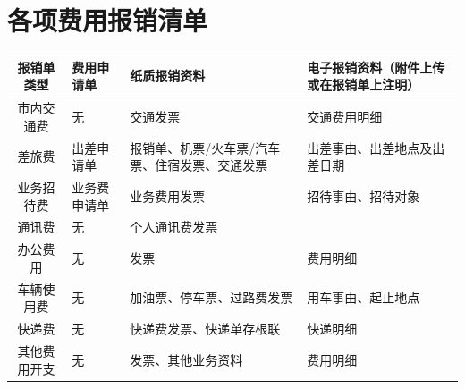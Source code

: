 \documentclass[scheme=plain,UTF8]{ctexart}
\begin{document}
\section{各项费用报销清单}

\begin{longtable}{|c|p{30mm}|p{40mm}|p{50mm}|}
    \hline
    \textbf{报销单类型} & \textbf{费用申请单} & \textbf{纸质报销资料} & \textbf{电子报销资料（附件上传或在报销单上注明）} \\
    \hline
    市内交通费 & 无     & 交通发票  & 交通费用明细 \\
    \hline
    差旅费   & 出差申请单 & 报销单、机票/火车票/汽车票、住宿发票、交通发票 & 出差事由、出差地点及出差日期 \\
    \hline
    业务招待费  & 业务费申请单 & 业务费用发票 & 招待事由、招待对象 \\
    \hline
    通讯费   & 无     & 个人通讯费发票 & \multicolumn{1}{c|}{} \\
    \hline
    办公费用  & 无     & 发票    & 费用明细 \\
    \hline
    车辆使用费 & 无     & 加油票、停车票、过路费发票 & 用车事由、起止地点 \\
    \hline
    快递费   & 无     & 快递费发票、快递单存根联 & 快递明细 \\
    \hline
    其他费用开支 & 无     & 发票、其他业务资料 & 费用明细 \\
    \hline
\end{longtable}%

\end{document}
